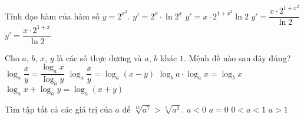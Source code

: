 \begin{ex}%
	Tính đạo hàm của hàm số $y=2^{x^2}$.
	\choice
	{$y'=2^x\cdot\ln2^x$}
	{\True $y'=x\cdot2^{1+x^2}\ln2$}
	{$y'=\dfrac{x\cdot2^{1+x^2}}{\ln2}$}
	{$y'=\dfrac{x\cdot2^{1+x}}{\ln2}$}
\end{ex}
\begin{ex}%
	Cho $a$, $b$, $x$, $y$ là các số thực dương và $a$, $b$ khác $1$. Mệnh đề nào sau đây đúng?
	\choice
	{$\log _{a} \dfrac{x}{y}=\dfrac{\log _{a} x}{\log _{a} y}$}
	{$\log _{a} \dfrac{x}{y}=\log _{a}(x-y)$}
	{\True $\log _{b} a \cdot \log _{a} x=\log _{b} x$}
	{$\log _{a} x+\log _{a} y=\log _{a}(x+y)$}
\end{ex}
\begin{ex}%
	Tìm tập tất cả các giá trị của $a$ để  $\sqrt[15]{a^7}>\sqrt[5]{a^2}$.
	\choice
	{$a<0$}
	{$a=0$}
	{$0<a<1$}
	{\True $a>1$}
\end{ex}
